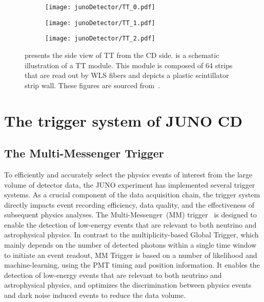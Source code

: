 \begin{figure}[htbp]
	\centering
	\begin{subfigure}{0.75\textwidth}
		\centering
		\texttt{[image: junoDetector/TT\_0.pdf]}
		\caption{}
		\label{fig:TT_0}
	\end{subfigure}%
	\hfill
	\begin{subfigure}{0.5\textwidth}
		\centering
		\texttt{[image: junoDetector/TT\_1.pdf]}
		\caption{}
		\label{fig:TT_1}
	\end{subfigure}%
	\hfill
	\begin{subfigure}{0.5\textwidth}
		\centering
		\texttt{[image: junoDetector/TT\_2.pdf]}
		\caption{}
		\label{fig:TT_2}
	\end{subfigure}
	\caption{ presents the side view of TT from the CD side.  is a schematic illustration of a TT module. This module is composed of 64 strips that are read out by WLS fibers and  depicts a plastic scintillator strip wall. These figures are sourced from~\cite{top_tracker}.}
	\label{fig:juno_TT}
\end{figure}

\section{The trigger system of JUNO CD}
\label{sec:juno_trigger}
\subsection{The Multi-Messenger Trigger}
To efficiently and accurately select the physics events of interest from the large volume of detector data, the JUNO experiment has implemented several trigger systems. As a crucial component of the data acquisition chain, the trigger system directly impacts event recording efficiency, data quality, and the effectiveness of subsequent physics analyses. The Multi-Messenger~(MM) trigger~\cite{MMtrigger} is designed to enable the detection of low-energy events that are relevant to both neutrino and astrophysical physics.
In contrast to the multiplicity-based Global Trigger, which mainly depends on the number of detected photons within a single time window to initiate an event readout, MM Trigger is based on a number of likelihood and machine-learning, using the PMT timing and position information. It enables the detection of low-energy events that are relevant to both neutrino and astrophysical physics, and optimizes the discrimination between physics events and dark noise induced events to reduce the data volume.

